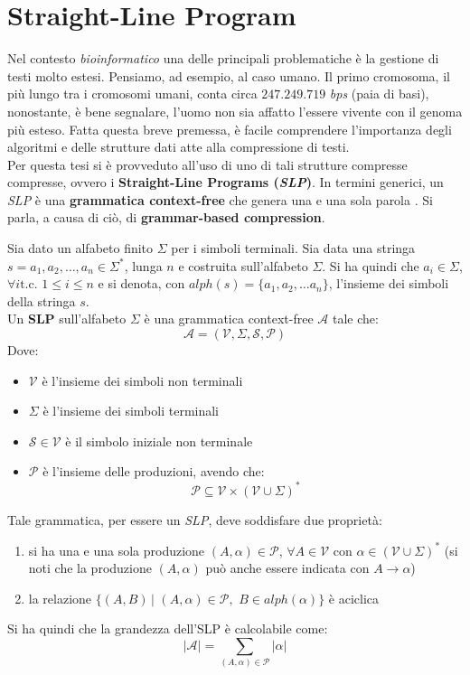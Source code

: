 \section{Straight-Line Program}
\label{slpsec}
Nel contesto \textit{bioinformatico} una delle principali problematiche è la
gestione di testi molto estesi. Pensiamo, ad esempio, al caso umano. Il primo
cromosoma, il più lungo tra i cromosomi umani, conta circa $247.249.719$
\textit{bps} (paia di basi), nonostante, è bene segnalare, l'uomo
non sia affatto l'essere vivente con il genoma più esteso. Fatta questa breve
premessa, è facile comprendere l'importanza degli algoritmi e delle strutture
dati atte alla compressione di testi.\\
Per questa tesi si è provveduto all'uso di uno di tali strutture compresse
compresse, ovvero i \textbf{Straight-Line Programs (\textit{SLP})}. In termini
generici, un \textit{SLP} è una \textbf{grammatica context-free} che 
genera una e una sola parola \cite{slpsurvey}. Si parla, a causa di ciò, di
\textbf{grammar-based compression}.
\begin{definizione}
  Sia dato un alfabeto finito $\Sigma$ per i simboli terminali. Sia data una
  stringa $s=a_1,a_2,\ldots, a_n\in\Sigma^{*}$, lunga $n$ e costruita
  sull'alfabeto $\Sigma$. Si ha quindi che $a_i\in\Sigma$, $\forall i \mbox{
    t.c. }1\leq i\leq n$ e si denota, con $alph(s)=\{a_1,a_2,\ldots
  a_n\}$, l'insieme dei simboli della stringa $s$.\\
  Un \textbf{SLP} sull'alfabeto $\Sigma$ è una grammatica context-free
  $\mathcal{A}$ tale che: 
  \[\mathcal{A}=\left(\mathcal{V}, \Sigma, \mathcal{S}, \mathcal{P}\right)\]
  Dove:
  \begin{itemize}
    \item $\mathcal{V}$ è l'insieme dei simboli non terminali
    \item $\Sigma$ è l'insieme dei simboli terminali
    \item $\mathcal{S}\in \mathcal{V}$ è il simbolo iniziale non terminale
    \item $\mathcal{P}$ è l'insieme delle produzioni, avendo che:
    \[\mathcal{P}\subseteq \mathcal{V}\times\left(\mathcal{V}\cup
        \Sigma\right)^{*}\] 
  \end{itemize}
  Tale grammatica, per essere un \textit{SLP}, deve soddisfare due proprietà:
  \begin{enumerate}
    \item si ha una e una sola produzione $(A,\alpha)\in \mathcal{P}$, $\forall
    A\in \mathcal{V}$ con $\alpha\in \left(\mathcal{V}\cup\Sigma\right)^{*}$ (si
    noti che la produzione $(A,\alpha)$ può anche essere indicata con
    $A\to\alpha$) 
    \item la relazione $\{(A,B)\,|\,\,(A,\alpha)\in\mathcal{P},\,\,B\in
    alph(\alpha)\}$ è aciclica
  \end{enumerate}
  Si ha quindi che la grandezza dell'SLP è calcolabile come:
  \[|\mathcal{A}| = \sum_{(A,\alpha)\in\mathcal{P}}|\alpha|\]
\end{definizione}
